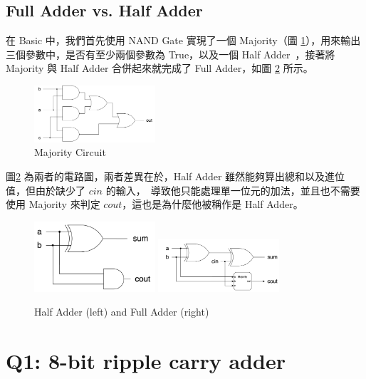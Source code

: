 \documentclass[10.5pt,compsoc,UTF8]{CjC}
\theoremstyle{mystyle}
\begin{document}
\newpage

\subsection{Full Adder vs. Half Adder}

在 Basic 中，我們首先使用 NAND Gate 實現了一個 Majority（圖 \ref{fig:Majority}），用來輸出三個參數中，是否有至少兩個參數為 True，以及一個 Half Adder\
，接著將 Majority 與 Half Adder 合併起來就完成了 Full Adder，如圖 \ref{fig:Half-Full Adder} 所示。

\begin{figure}[htp]
  \centering
  \includegraphics[width=0.4\textwidth]{Majority.png}
  \caption{Majority Circuit}
  \label{fig:Majority}
\end{figure}
\par

圖\ref{fig:Half-Full Adder} 為兩者的電路圖，兩者差異在於，Half Adder 雖然能夠算出總和以及進位值，但由於缺少了 $cin$  的輸入，\
導致他只能處理單一位元的加法，並且也不需要使用 Majority 來判定 $cout$，這也是為什麼他被稱作是 Half Adder。
\begin{figure}[htp]
  \centering
  \includegraphics[width=0.4\textwidth]{Half-Adder.png}
  \includegraphics[width=0.4\textwidth]{Full-Adder.png}
  \caption{Half Adder (left) and Full Adder (right)}
  \label{fig:Half-Full Adder}
\end{figure}

\newpage

\section{Q1: 8-bit ripple carry adder}
\label{sec:Q1}
\end{document}
